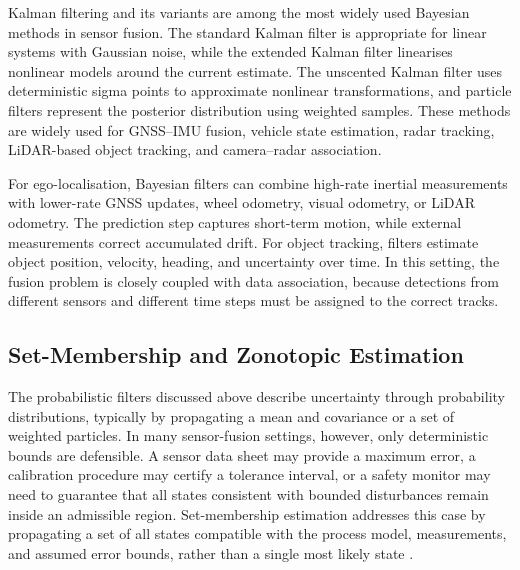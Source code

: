 \documentclass{ieeeaccess}
\begin{document}
Kalman filtering and its variants are among the most widely used Bayesian methods in sensor fusion. The standard Kalman filter is appropriate for linear systems with Gaussian noise, while the extended Kalman filter linearises nonlinear models around the current estimate. The unscented Kalman filter uses deterministic sigma points to approximate nonlinear transformations, and particle filters represent the posterior distribution using weighted samples. These methods are widely used for GNSS--IMU fusion, vehicle state estimation, radar tracking, LiDAR-based object tracking, and camera--radar association.

For ego-localisation, Bayesian filters can combine high-rate inertial measurements with lower-rate GNSS updates, wheel odometry, visual odometry, or LiDAR odometry. The prediction step captures short-term motion, while external measurements correct accumulated drift. For object tracking, filters estimate object position, velocity, heading, and uncertainty over time. In this setting, the fusion problem is closely coupled with data association, because detections from different sensors and different time steps must be assigned to the correct tracks.

\subsection{Set-Membership and Zonotopic Estimation}

The probabilistic filters discussed above describe uncertainty through probability distributions, typically by propagating a mean and covariance or a set of weighted particles. In many sensor-fusion settings, however, only deterministic bounds are defensible. A sensor data sheet may provide a maximum error, a calibration procedure may certify a tolerance interval, or a safety monitor may need to guarantee that all states consistent with bounded disturbances remain inside an admissible region. Set-membership estimation addresses this case by propagating a set of all states compatible with the process model, measurements, and assumed error bounds, rather than a single most likely state \cite{alamo2005_zonotopes,rego2020_constrained_zonotopes}.
\end{document}
